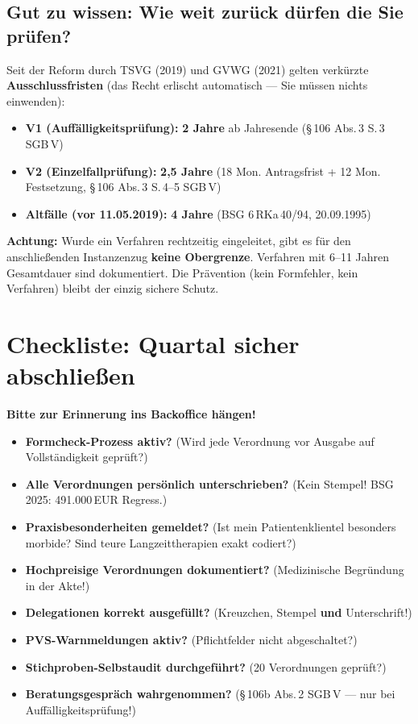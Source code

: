 \documentclass[a4paper]{umbruch-position}
\begin{document}
\subsection{Gut zu wissen: Wie weit zur\"uck d\"urfen die Sie pr\"ufen?}

Seit der Reform durch TSVG (2019) und GVWG (2021) gelten verk\"urzte \textbf{Ausschlussfristen} (das Recht erlischt automatisch --- Sie m\"ussen nichts einwenden):

\begin{itemize}[nosep]
  \item \textbf{V1 (Auff\"alligkeitspr\"ufung):} \textbf{2 Jahre} ab Jahresende (\S\,106 Abs.\,3 S.\,3 SGB\,V)
  \item \textbf{V2 (Einzelfallpr\"ufung):} \textbf{2,5 Jahre} (18 Mon. Antragsfrist + 12 Mon. Festsetzung, \S\,106 Abs.\,3 S.\,4--5 SGB\,V)
  \item \textbf{Altf\"alle (vor 11.05.2019):} \textbf{4 Jahre} (BSG 6\,RKa\,40/94, 20.09.1995)
\end{itemize}

\textbf{Achtung:} Wurde ein Verfahren rechtzeitig eingeleitet, gibt es f\"ur den anschlie\ss{}enden Instanzenzug \textbf{keine Obergrenze}. Verfahren mit 6--11 Jahren Gesamtdauer sind dokumentiert. Die Pr\"avention (kein Formfehler, kein Verfahren) bleibt der einzig sichere Schutz.

\section{Checkliste: Quartal sicher abschlie\ss{}en}

\begin{center}
\textbf{Bitte zur Erinnerung ins Backoffice h\"angen!}
\end{center}

\begin{itemize}
    \item[$\square$] \textbf{Formcheck-Prozess aktiv?} (Wird jede Verordnung vor Ausgabe auf Vollst\"andigkeit gepr\"uft?)
    \item[$\square$] \textbf{Alle Verordnungen pers\"onlich unterschrieben?} (Kein Stempel! BSG 2025: 491.000\,EUR Regress.)
    \item[$\square$] \textbf{Praxisbesonderheiten gemeldet?} (Ist mein Patientenklientel besonders morbide? Sind teure Langzeittherapien exakt codiert?)
    \item[$\square$] \textbf{Hochpreisige Verordnungen dokumentiert?} (Medizinische Begr\"undung in der Akte!)
    \item[$\square$] \textbf{Delegationen korrekt ausgef\"ullt?} (Kreuzchen, Stempel \textbf{und} Unterschrift!)
    \item[$\square$] \textbf{PVS-Warnmeldungen aktiv?} (Pflichtfelder nicht abgeschaltet?)
    \item[$\square$] \textbf{Stichproben-Selbstaudit durchgef\"uhrt?} (20 Verordnungen gepr\"uft?)
    \item[$\square$] \textbf{Beratungsgespr\"ach wahrgenommen?} (\S\,106b Abs.\,2 SGB\,V --- nur bei Auff\"alligkeitspr\"ufung!)
\end{itemize}
\end{document}
